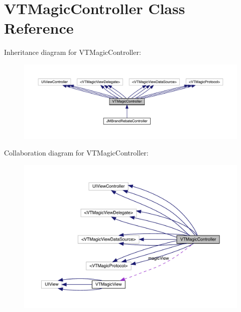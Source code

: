 \hypertarget{interface_v_t_magic_controller}{}\section{V\+T\+Magic\+Controller Class Reference}
\label{interface_v_t_magic_controller}


Inheritance diagram for V\+T\+Magic\+Controller\+:\nopagebreak
\begin{figure}[H]
\begin{center}
\leavevmode
\includegraphics[width=350pt]{interface_v_t_magic_controller__inherit__graph}
\end{center}
\end{figure}


Collaboration diagram for V\+T\+Magic\+Controller\+:\nopagebreak
\begin{figure}[H]
\begin{center}
\leavevmode
\includegraphics[width=350pt]{interface_v_t_magic_controller__coll__graph}
\end{center}
\end{figure}
